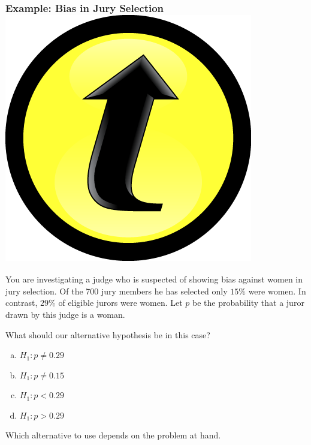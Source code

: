\documentclass[handout]{beamer}
\begin{document}
\begin{frame}
\frametitle{Example: Bias in Jury Selection \hfill \includegraphics[scale = 0.05]{./images/clicker}}
You are investigating a judge who is suspected of showing bias against women in jury selection. Of the 700 jury members he has selected only $15\%$ were women. In contrast, $29\%$ of eligible jurors were women. Let $p$ be the probability that a juror drawn by this judge is a woman.\\

\vspace{1em}

\alert{What should our alternative hypothesis be in this case?}

\begin{enumerate}[(a)]
	\item $H_1\colon p \neq 0.29$
	\item $H_1\colon p \neq 0.15$
	\item $H_1\colon p < 0.29$
	\item $H_1\colon p > 0.29$
\end{enumerate}

\end{frame}


\begin{frame}
\begin{center}
\huge Which alternative to use depends on the problem at hand.
\end{center}
\end{frame}
\end{document}
